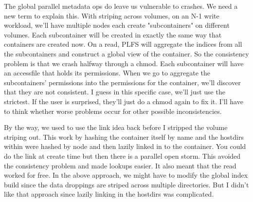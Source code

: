 \documentclass[10pt]{article}
\begin{document}
The global parallel metadata ops do leave us vulnerable to crashes.  We
need a new term to explain this.  With striping across volumes, on an
N-1 write workload, we'll have multiple nodes each create
"subcontainers" on different volumes.  Each subcontainer will be created
in exactly the same way that containers are created now.  On a read,
PLFS will aggregate the indices from all the subcontainers and construct
a global view of the container.  So the consistency problem is that we
crash halfway through a chmod.  Each subcontainer will have an
accessfile that holds its permissions.  When we go to aggregate the
subcontainers' permissions into the permissions for the container, we'll
discover that they are not consistent.  I guess in this specific case,
we'll just use the strictest.  If the user is surprised, they'll just do
a chmod again to fix it.  I'll have to think whether worse problems
occur for other possible inconsistencies.


By the way, we used to use the link idea back before I stripped the
volume striping out.  This work by hashing the container itself by name
and the hostdirs within were hashed by node and then lazily linked in to
the container.  You could do the link at create time but then there is a
parallel open storm.  This avoided the consistency problem and made
lookups easier.  It also meant that the read worked for free.  In the
above approach, we might have to modify the global index build since the
data droppings are striped across multiple directories.  But I didn't
like that approach since lazily linking in the hostdirs was complicated.
\end{document}
